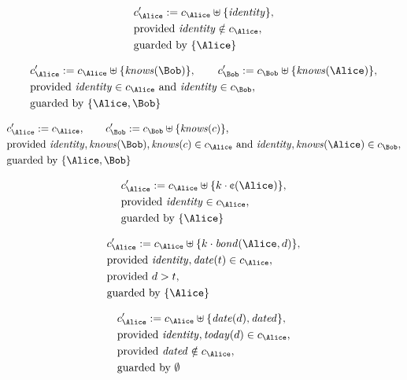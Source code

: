 \begin{align*}
&
c'_
{
\Alice
}
 := 
c_
{
\Alice
}
 \uplus 
\{
\mathit{
identity
}
\}
,\\
&
\text{provided } 
\mathit{
identity
}
 \notin c_
{
\Alice
}
,\\
&
\text{guarded by } \{
\Alice
\}
\end{align*}

\begin{align*}
&
c'_
{
\Alice
}
 := 
c_
{
\Alice
}
 \uplus 
\{
\mathit{
knows
}
(
\Bob
)
\}
, \qquad 
c'_
{
\Bob
}
 := 
c_
{
\Bob
}
 \uplus 
\{
\mathit{
knows
}
(
\Alice
)
\}
,\\
&
\text{provided } 
\mathit{
identity
}
 \in c_
{
\Alice
}
 \text{ and } 
\mathit{
identity
}
 \in c_
{
\Bob
}
,\\
&
\text{guarded by } \{
\Alice
,
\Bob
\}
\end{align*}

\begin{align*}
&
c'_
{
\Alice
}
 := 
c_
{
\Alice
}
, \qquad 
c'_
{
\Bob
}
 := 
c_
{
\Bob
}
 \uplus 
\{
\mathit{
knows
}
(
c
)
\}
,\\
&
\text{provided } 
\mathit{
identity
}
,
\mathit{
knows
}
(
\Bob
)
,
\mathit{
knows
}
(
c
)
 \in c_
{
\Alice
}
 \text{ and } 
\mathit{
identity
}
,
\mathit{
knows
}
(
\Alice
)
 \in c_
{
\Bob
}
,\\
&
\text{guarded by } \{
\Alice
,
\Bob
\}
\end{align*}

\begin{align*}
&
c'_
{
\Alice
}
 := 
c_
{
\Alice
}
 \uplus 
\{
k
\cdot
\text{\textcent}
(
\Alice
)
\}
,\\
&
\text{provided } 
\mathit{
identity
}
 \in c_
{
\Alice
}
,\\
&
\text{guarded by } \{
\Alice
\}
\end{align*}

\begin{align*}
&
c'_
{
\Alice
}
 := 
c_
{
\Alice
}
 \uplus 
\{
k
\cdot
\mathit{
bond
}
(
\Alice
,
d
)
\}
,\\
&
\text{provided } 
\mathit{
identity
}
,
\mathit{
date
}
(
t
)
 \in c_
{
\Alice
}
,\\
&
\text{provided } 
d
>
t
,\\
&
\text{guarded by } \{
\Alice
\}
\end{align*}

\begin{align*}
&
c'_
{
\Alice
}
 := 
c_
{
\Alice
}
 \uplus 
\{
\mathit{
date
}
(
d
)
,
\mathit{
dated
}
\}
,\\
&
\text{provided } 
\mathit{
identity
}
,
\mathit{
today
}
(
d
)
 \in c_
{
\Alice
}
,\\
&
\text{provided } 
\mathit{
dated
}
 \notin c_
{
\Alice
}
,\\
&
\text{guarded by } \emptyset
\end{align*}
